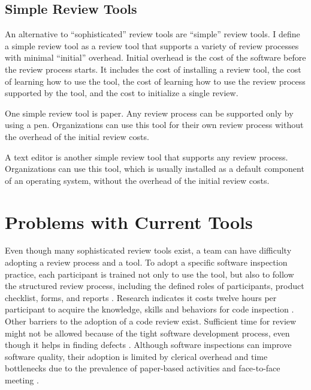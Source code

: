 \subsection{Simple Review Tools}
\label{subsec:simple-review-tools}

An alternative to ``sophisticated'' review tools are ``simple'' review tools. I define a simple review tool as a review tool that supports a variety of review processes with minimal ``initial'' overhead. Initial overhead is the cost of the software before the review process starts. It includes the cost of installing a review tool, the cost of learning how to use the tool, the cost of learning how to use the review process supported by the tool, and the cost to initialize a single review.

One simple review tool is paper. Any review process can be supported only by using a pen. Organizations can use this tool for their own review process without the overhead of the initial review costs.

A text editor is another simple review tool that supports any review process. Organizations can use this tool, which is usually installed as a default component of an operating system, without the overhead of the initial review costs.

\section{Problems with Current Tools}
\label{sec:problems-with-current-tools}

Even though many sophisticated review tools exist, a team can have difficulty adopting a review process and a tool. To adopt a specific software inspection practice, each participant is trained not only to use the tool, but also to follow the structured review process, including the defined roles of participants, product checklist, forms, and reports \cite{o'neil:software}. Research indicates it costs twelve hours per participant to acquire the knowledge, skills and behaviors for code inspection \cite{o'neil:inspections}. Other barriers to the adoption of a code review exist. Sufficient time for review might not be allowed because of the tight software development process, even though it helps in finding defects \cite{wiegers:seven}. Although software inspections can improve software quality, their adoption is limited by clerical overhead and time bottlenecks due to the prevalence of paper-based activities and face-to-face meeting \cite{filippo:tool}.

